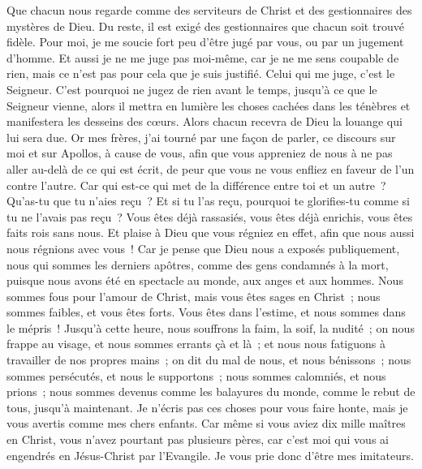 \begin{multicols}{2}
\VerseOne{}Que chacun nous regarde comme des serviteurs de Christ et des gestionnaires des mystères de Dieu.
Du reste, il est exigé des gestionnaires que chacun soit trouvé fidèle.
Pour moi, je me soucie fort peu d'être jugé par vous, ou par un jugement d'homme. Et aussi je ne me juge pas moi-même, car je ne me sens coupable de rien,
mais ce n'est pas pour cela que je suis justifié. Celui qui me juge, c'est le Seigneur.
C'est pourquoi ne jugez de rien avant le temps, jusqu'à ce que le Seigneur vienne, alors il mettra en lumière les choses cachées dans les ténèbres et manifestera les desseins des cœurs. Alors chacun recevra de Dieu la louange qui lui sera due.
Or mes frères, j'ai tourné par une façon de parler, ce discours sur moi et sur Apollos, à cause de vous, afin que vous appreniez de nous à ne pas aller au-delà de ce qui est écrit, de peur que vous ne vous enfliez en faveur de l'un contre l'autre. 
Car qui est-ce qui met de la différence entre toi et un autre~? Qu'as-tu que tu n'aies reçu~? Et si tu l'as reçu, pourquoi te glorifies-tu comme si tu ne l'avais pas reçu~?
Vous êtes déjà rassasiés, vous êtes déjà enrichis, vous êtes faits rois sans nous. Et plaise à Dieu que vous régniez en effet, afin que nous aussi nous régnions avec vous~!
Car je pense que Dieu nous a exposés publiquement, nous qui sommes les derniers apôtres, comme des gens condamnés à la mort, puisque nous avons été en spectacle au monde, aux anges et aux hommes.
Nous sommes fous pour l'amour de Christ, mais vous êtes sages en Christ~; nous sommes faibles, et vous êtes forts. Vous êtes dans l'estime, et nous sommes dans le mépris~!
Jusqu'à cette heure, nous souffrons la faim, la soif, la nudité~; on nous frappe au visage, et nous sommes errants çà et là~;
et nous nous fatiguons à travailler de nos propres mains~; on dit du mal de nous, et nous bénissons~; nous sommes persécutés, et nous le supportons~;
nous sommes calomniés, et nous prions~; nous sommes devenus comme les balayures du monde, comme le rebut de tous, jusqu'à maintenant.
Je n'écris pas ces choses pour vous faire honte, mais je vous avertis comme mes chers enfants.
Car même si vous aviez dix mille maîtres en Christ, vous n'avez pourtant pas plusieurs pères, car c'est moi qui vous ai engendrés en Jésus-Christ par l'Evangile.
Je vous prie donc d'être mes imitateurs.

\end{multicols}
